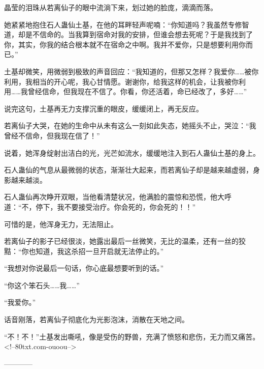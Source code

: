 \begin{this_body}
晶莹的泪珠从若离仙子的眼中流淌下来，划过她的脸庞，滴滴而落。

她紧紧地抱住石人蛊仙土基，在他的耳畔轻声呢喃：“你知道吗？我虽然专修智道，却是不信命的。当我算到宿命对我的安排，但谁会想去死呢？于是我找到了你，其实，你我的结合根本就不在宿命之中啊。我并不爱你，只是想要利用你而已。”

土基却微笑，用微弱到极致的声音回应：“我知道的，但那又怎样？我爱你……被你利用，我相当的开心呢，我心甘情愿。谢谢你，给我这样的机会，让我被你利用……我曾经信命，但我现在不信了。你看，你还活着，命已经改了，多好……”

说完这句，土基再无力支撑沉重的眼皮，缓缓闭上，再无反应。

若离仙子大哭，在她的生命中从未有这么一刻如此失态，她摇头不止，哭泣：“我曾经不信命，但我现在信了！”

说着，她浑身绽射出洁白的光，光芒如流水，缓缓地注入到石人蛊仙土基的身上。

石人蛊仙的气息从最微弱的状态，渐渐壮大起来，而若离仙子却是越来越虚弱，身影越来越淡。

石人蛊仙再次睁开双眼，当他看清楚状况，他满脸的震惊和恐慌，他大呼道：“不，停下，我不要接受治疗。你会死的，你会死的！！”

可惜的是，他浑身无力，无法阻止。

若离仙子的影子已经很淡，她露出最后一丝微笑，无比的温柔，还有一丝的狡黠：“你也知道，我这杀招一旦开启就无法停止的。”

“我想对你说最后一句话，你心底最想要听到的话。”

“你这个笨石头……我……”

“我爱你。”

话音刚落，若离仙子彻底化为光影泡沫，消散在天地之间。

“不！不！”土基发出嘶吼，像是受伤的野兽，充满了愤怒和悲伤，无力而又痛苦。<!--80txt.com-ouoou-->

------------

\end{this_body}

